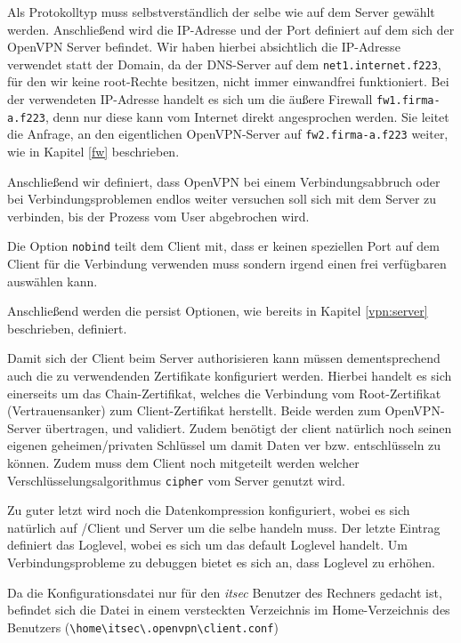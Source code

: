 Als Protokolltyp muss selbstverständlich der selbe wie auf dem Server gewählt werden. Anschließend wird die IP-Adresse und der Port definiert auf dem sich der OpenVPN Server befindet. Wir haben hierbei absichtlich die IP-Adresse verwendet statt der Domain, da der DNS-Server auf dem \texttt{net1.internet.f223}, für den wir keine root-Rechte besitzen, nicht immer einwandfrei funktioniert. Bei der verwendeten IP-Adresse handelt es sich um die äußere Firewall \texttt{fw1.firma-a.f223}, denn nur diese kann vom Internet direkt angesprochen werden. Sie leitet die Anfrage, an den eigentlichen OpenVPN-Server auf \texttt{fw2.firma-a.f223} weiter, wie in Kapitel \ref{fw} beschrieben.

Anschließend wir definiert, dass OpenVPN bei einem Verbindungsabbruch oder bei Verbindungsproblemen endlos weiter versuchen soll sich mit dem Server zu verbinden, bis der Prozess vom User abgebrochen wird.

Die Option \texttt{nobind} teilt dem Client mit, dass er keinen speziellen Port auf dem Client für die Verbindung verwenden muss sondern irgend einen frei verfügbaren auswählen kann.

Anschließend werden die persist Optionen, wie bereits in Kapitel \ref{vpn:server} beschrieben, definiert.

Damit sich der Client beim Server authorisieren kann müssen dementsprechend auch die zu verwendenden Zertifikate konfiguriert werden. Hierbei handelt es sich einerseits um das Chain-Zertifikat, welches die Verbindung vom Root-Zertifikat (Vertrauensanker) zum Client-Zertifikat herstellt. Beide werden zum OpenVPN-Server übertragen, und validiert. Zudem benötigt der client natürlich noch seinen eigenen geheimen/privaten Schlüssel um damit Daten ver bzw. entschlüsseln zu können. Zudem muss dem Client noch mitgeteilt werden welcher Verschlüsselungsalgorithmus \texttt{cipher} vom Server genutzt wird.

Zu guter letzt wird noch die Datenkompression konfiguriert, wobei es sich natürlich auf /Client und Server um die selbe handeln muss. Der letzte Eintrag definiert das Loglevel, wobei es sich um das default Loglevel handelt. Um Verbindungsprobleme zu debuggen bietet es sich an, dass Loglevel zu erhöhen.

Da die Konfigurationsdatei nur für den \emph{itsec} Benutzer des Rechners gedacht ist, befindet sich die Datei in einem versteckten Verzeichnis im Home-Verzeichnis des Benutzers (\texttt{\textbackslash home\textbackslash itsec\textbackslash .openvpn\textbackslash client.conf})

